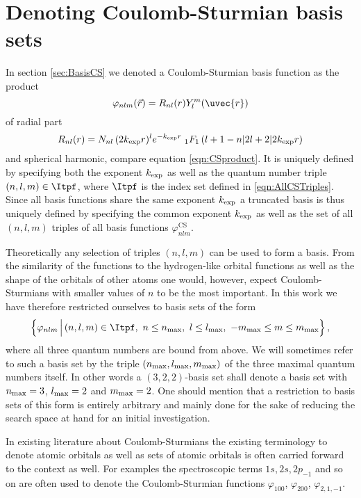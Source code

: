 \section{Denoting Coulomb-Sturmian basis sets}
\label{sec:DenotingCSbasis}
In section \vref{sec:BasisCS}
we denoted a Coulomb-Sturmian basis function as the product
\begin{equation}
	\varphi_{nlm}(\vec{r}) = R_{nl}(r) Y_l^m(\uvec{r})
\end{equation}
of radial part
\begin{equation}
	\label{eqn:RadialPartCsRepeated}
	R_{nl}(r) = N_{nl} \, (2k_\text{exp} r)^l e^{-k_\text{exp} r}
	\;_1F_1\left(l+1-n \middle| 2l+2 \middle|2k_\text{exp} r\right)
\end{equation}
and spherical harmonic, compare equation \eqref{eqn:CSproduct}.
It is uniquely defined by specifying both the \CS exponent $k_\text{exp}$
as well as the quantum number triple $(n,l,m) \in \Itpf$,
where $\Itpf$ is the index set defined in \eqref{eqn:AllCSTriples}.
Since all basis functions share the same exponent $k_\text{exp}$
a truncated \CS basis is thus uniquely defined by specifying
the common exponent $k_\text{exp}$ as well as the set of all $(n, l, m)$
triples of all basis functions $\varphi^\text{CS}_{nlm}$.

Theoretically any selection of triples $(n, l, m)$ can be used to form a \CS basis.
From the similarity of the \CS functions to the hydrogen-like orbital functions
as well as the shape of the orbitals of other atoms
one would, however, expect Coulomb-Sturmians with smaller values of $n$
to be the most important.
In this work we have therefore restricted ourselves to \CS basis sets
of the form
\[ \left\{ \varphi_{nlm} \, \Big| \,  (n, l, m) \in \Itpf, \   n \le \nmax,
	\  l \le \lmax,
	\  -\mmax \le m \le \mmax \right\},
\]
\ie where all three quantum numbers are bound from above.
We will sometimes refer to such a \CS basis set by the triple
$(n_\text{max}, l_\text{max}, m_\text{max})$ of the three maximal quantum numbers itself.
In other words a $(3,2,2)$-basis set shall denote a basis set with
$n_\text{max} = 3$, $l_\text{max} = 2$ and $m_\text{max} = 2$.
One should mention that a restriction to basis sets of this form
is entirely arbitrary
and mainly done for the sake of reducing the search space at hand
for an initial investigation.

In existing literature about Coulomb-Sturmians the existing terminology
to denote atomic orbitals as well as sets of atomic orbitals is often carried
forward to the \CS context as well.
For examples the spectroscopic terms $1s, 2s, 2p_{-1}$ and so on
are often used to denote the Coulomb-Sturmian functions
$\varphi_{100}$, $\varphi_{200}$, $\varphi_{2,1,-1}$.
